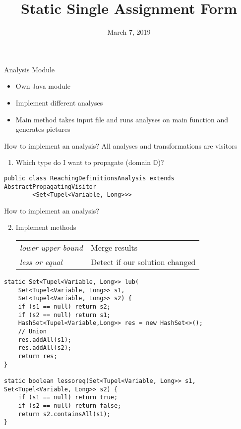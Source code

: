\documentclass[xcolor={usenames,dvipsnames}, aspectratio=169, 12pt]{beamer}
\title[Program Optimization]{Static Single Assignment Form}
\date{March 7, 2019}
\institute{Technische Universität München}
\begin{document}
\frame[plain]{\titlepage}

\begin{frame}{Analysis Module}
\begin{itemize}
	\item Own Java module
	\item Implement different analyses
	\item Main method takes input file and runs analyses on main function and generates pictures
\end{itemize}
\end{frame}

\begin{frame}[fragile]{How to implement an analysis?}
All analyses and transformations are visitors
\begin{enumerate}
	\item Which type do I want to propagate (domain $\mathbb{D}$)?
\end{enumerate}

\begin{lstlisting}
public class ReachingDefinitionsAnalysis extends AbstractPropagatingVisitor
		<Set<Tupel<Variable, Long>>>
\end{lstlisting}
\end{frame}

\begin{frame}[fragile]{How to implement an analysis?}
\begin{enumerate}
	\setcounter{enumi}{1}
	\item Implement methods\\
	\begin{tabular}{ll}
		\emph{lower upper bound} & Merge results\\
		\emph{less or equal} & Detect if our solution changed\\
	\end{tabular}
\end{enumerate}

\vspace{-0.3cm}
\begin{lstlisting}
static Set<Tupel<Variable, Long>> lub(
	Set<Tupel<Variable, Long>> s1,
	Set<Tupel<Variable, Long>> s2) {
    if (s1 == null) return s2;
    if (s2 == null) return s1;
    HashSet<Tupel<Variable,Long>> res = new HashSet<>();
    // Union
    res.addAll(s1);
    res.addAll(s2);
    return res;
}

static boolean lessoreq(Set<Tupel<Variable, Long>> s1, Set<Tupel<Variable, Long>> s2) {
    if (s1 == null) return true;
    if (s2 == null) return false;
    return s2.containsAll(s1);
}
\end{lstlisting}
\end{frame}
\end{document}
